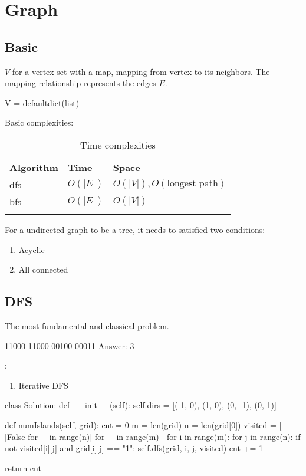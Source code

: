 \chapter{Graph}

\section{Basic}
 $V$ for a vertex set with a map, mapping from vertex to its neighbors. The mapping relationship represents the edges $E$.
\begin{python}
V = defaultdict(list)
\end{python}

 Basic complexities:

\begin{table}

\begin{tabular}{lll}
\hline\noalign{\smallskip}
\textbf{Algorithm} & \textbf{Time}  & \textbf{Space}\\
\noalign{\smallskip}\hline\noalign{\smallskip}
dfs & $O(|E|)$ & $O(|V|), O(\text{longest path})$ \\
bfs & $O(|E|)$ & $O(|V|)$ \\
\noalign{\smallskip}\hline\noalign{\smallskip}
\end{tabular}

\caption{Time complexities}
\end{table}

 For a undirected graph to be a tree, it needs to satisfied two conditions:
\begin{enumerate}
\item Acyclic
\item All connected
\end{enumerate}
\section{DFS}
 The most fundamental and classical problem.
\begin{python}
11000
11000
00100
00011
Answer: 3
\end{python}
:
\begin{enumerate}
\item Iterative DFS
\end{enumerate}
\begin{python}
class Solution:
  def __init__(self):
    self.dirs = [(-1, 0), (1, 0), (0, -1), (0, 1)]

  def numIslands(self, grid):
    cnt = 0
    m = len(grid)
    n = len(grid[0])
    visited = [
      [False for _ in range(n)]
      for _ in range(m)
    ]
    for i in range(m):
      for j in range(n):
        if not visited[i][j] and grid[i][j] == "1":
          self.dfs(grid, i, j, visited)
          cnt += 1

    return cnt
\end{python}

